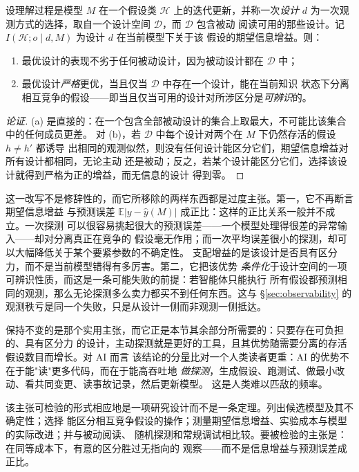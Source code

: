 \begin{proposition}[主动探测的优势]\label{prop:active}
设理解过程是模型 $M$ 在一个假设类 $\mathcal{H}$ 上的迭代更新，并称一次\emph{设计}
$d$ 为一次观测方式的选择，取自一个设计空间 $\mathcal{D}$，而 $\mathcal{D}$ 包含被动
阅读可用的那些设计。记 $I(\mathcal{H}; o \mid d, M)$ 为设计 $d$ 在当前模型下关于该
假设的期望信息增益。则：
\begin{enumerate}[label=(\alph*)]
\item 最优设计的表现不劣于任何被动设计，因为被动设计都在 $\mathcal{D}$ 中；
\item 最优设计\emph{严格}更优，当且仅当 $\mathcal{D}$ 中存在一个设计，能在当前知识
      状态下分离相互竞争的假设——即当且仅当可用的设计对所涉区分是\emph{可辨识}的。
\end{enumerate}
\end{proposition}

\begin{proof}[论证]
(a) 是直接的：在一个包含全部被动设计的集合上取最大，不可能比该集合中的任何成员更差。
对 (b)，若 $\mathcal{D}$ 中每个设计对两个在 $M$ 下仍然存活的假设 $h \ne h'$ 都诱导
出相同的观测似然，则没有任何设计能区分它们，期望信息增益对所有设计都相同，无论主动
还是被动；反之，若某个设计能区分它们，选择该设计就得到严格为正的增益，而无信息的设计
得到零。
\end{proof}

这一改写不是修辞性的，而它所移除的两样东西都是过度主张。第一，它不再断言期望信息增益
与预测误差 $\mathbb{E}|y - \hat{y}(M)|$ 成正比：这样的正比关系一般并不成立。一次探测
可以很容易挑起很大的预测误差——一个模型处理得很差的异常输入——却对分离真正在竞争的
假设毫无作用；而一次平均误差很小的探测，却可以大幅降低关于某个要紧参数的不确定性。
支配增益的是该设计是否具有区分力，而不是当前模型错得有多厉害。第二，它把该优势
\emph{条件化}于设计空间的一项可辨识性质，而这是一条可能失败的前提：若智能体只能执行
所有假设都预测相同的观测，那么无论探测多么卖力都买不到任何东西。这与
\S\ref{sec:observability} 的观测秩亏是同一个失败，只是从设计一侧而非观测一侧抵达。

保持不变的是那个实用主张，而它正是本节其余部分所需要的：只要存在可负担的、具有区分力
的设计，主动探测就是更好的工具，且其优势随需要分离的存活假设数目而增长。对 AI 而言
该结论的分量比对一个人类读者更重：AI 的优势不在于能"读"更多代码，而在于能高吞吐地
\emph{做探测}，生成假设、跑测试、做最小改动、看共同变更、读事故记录，然后更新模型。
这是人类难以匹敌的频率。

该主张可检验的形式相应地是一项研究设计而不是一条定理。列出候选模型及其不确定性；选择
能区分相互竞争假设的操作；测量期望信息增益、实验成本与模型的实际改进；并与被动阅读、
随机探测和常规调试相比较。要被检验的主张是：在同等成本下，有意的区分胜过无指向的
观察——而不是信息增益与预测误差成正比。

